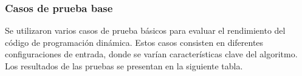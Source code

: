 \subsubsection*{Casos de prueba base}
Se utilizaron varios casos de prueba básicos para evaluar el rendimiento del código de programación dinámica. Estos casos consisten en diferentes configuraciones de entrada, donde se varían características clave del algoritmo. Los resultados de las pruebas se presentan en la siguiente tabla.
\begin{table}[h]
\centering
{}
\end{table}

